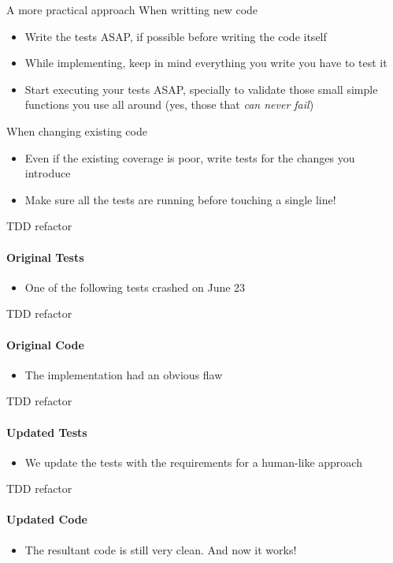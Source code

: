 \documentclass[aspectratio=169]{beamer}
\begin{document}
\begin{frame}{A more practical approach}
    When writting new code
    \begin{itemize}
    \item Write the tests ASAP, if possible before writing the code itself
    \item While implementing, keep in mind everything you write you have to test it
    \item Start executing your tests ASAP, specially to validate those small simple functions you use all around (yes,
    those that \emph{can never fail})
    \pause
    \end{itemize}
    When changing existing code
    \begin{itemize}
    \item Even if the existing coverage is poor, write tests for the changes you introduce
    \item Make sure all the tests are running before touching a single line!
    \end{itemize}
\end{frame}

\begin{frame}{TDD refactor}
    \framesubtitle{Original Tests}
    \begin{itemize}
    \item One of the following tests crashed on June 23
    
    \end{itemize}
\end{frame}

\begin{frame}{TDD refactor}
    \framesubtitle{Original Code}
    \begin{itemize}
    \item The implementation had an obvious flaw
    
    \end{itemize}
\end{frame}

\begin{frame}{TDD refactor}
    \framesubtitle{Updated Tests}
    \begin{itemize}
    \item We update the tests with the requirements for a human-like approach
    
    \end{itemize}
\end{frame}

\begin{frame}{TDD refactor}
    \framesubtitle{Updated Code}
    \begin{itemize}
    \item The resultant code is still very clean. And now it works!
    
    \end{itemize}
\end{frame}
\end{document}
